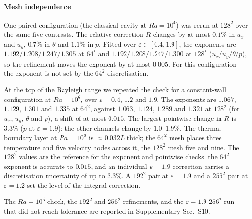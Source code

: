 \documentclass[preprint,11pt,a4paper,times,doubleblind]{elsarticle}
\begin{document}
\paragraph{Mesh independence} One paired configuration (the classical cavity at $Ra=10^4$) was
rerun at $128^2$ over the same five contrasts. The relative correction $R$ changes by at most
$0.1\%$ in $u_x$ and $u_y$, $0.7\%$ in $\theta$ and $1.1\%$ in $p$. Fitted over
$\varepsilon\in[0.4,1.9]$, the exponents are $1.192/1.208/1.247/1.305$ at $64^2$ and
$1.192/1.208/1.247/1.300$ at $128^2$ ($u_x/u_y/\theta/p$), so the refinement moves the exponent by
at most $0.005$. For this configuration the exponent is not set by the $64^2$
discretisation.

At the top of the Rayleigh range we repeated the check for a constant-wall configuration at
$Ra=10^6$, over $\varepsilon=0.4$, $1.2$ and $1.9$. The exponents are
$1.067$, $1.129$, $1.301$ and $1.335$ at $64^2$, against $1.063$, $1.124$, $1.289$ and $1.321$
at $128^2$ (for $u_x$, $u_y$, $\theta$ and $p$), a shift of at most $0.015$. The largest pointwise change in $R$ is $3.3\%$
($p$ at $\varepsilon=1.9$); the other channels change by $1.0$--$1.9\%$. The thermal boundary layer
at $Ra=10^6$ is $\approx0.032L$ thick; the $64^2$ mesh places three temperature and five velocity
nodes across it, the $128^2$ mesh five and nine. The $128^2$ values are the reference for the exponent and
pointwise checks: the $64^2$ exponent is accurate to $0.015$, and an individual $\varepsilon=1.9$
correction carries a discretisation uncertainty of up to $3.3\%$. A $192^2$ pair at
$\varepsilon=1.9$ and a $256^2$ pair at $\varepsilon=1.2$ set the level of the integral
correction.

The $Ra=10^5$ check, the $192^2$ and $256^2$ refinements, and the $\varepsilon=1.9$ $256^2$
run that did not reach tolerance are reported in Supplementary Sec.~S10.
\end{document}
